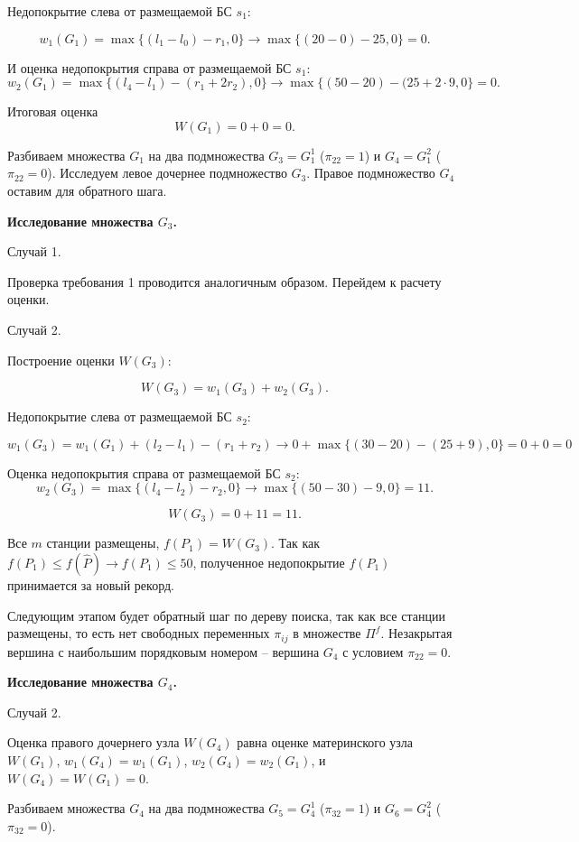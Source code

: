 Недопокрытие слева от размещаемой БС $s_1$:

$$
w_1(G_1) = \max\{(l_1 - l_0) - r_1, 0\} \rightarrow \max\{(20 - 0) - 25, 0\} = 0.
$$

И оценка недопокрытия справа от размещаемой БС $s_1$: 
$$
w_2(G_1) = \max\{(l_4 - l_1) - (r_1 + 2r_2), 0\} \rightarrow \max\{(50 - 20) - (25 + 2 \cdot 9, 0\} = 0.
$$

Итоговая оценка
$$
W(G_1) = 0 + 0 = 0.
$$

Разбиваем множества $G_1$ на два подмножества $G_3 = G^1_1$ ($\pi_{22} = 1$) и $G_4 = G^2_1$ ($\pi_{22} = 0$). Исследуем  левое дочернее подмножество $G_3$. Правое подмножество $G_4$ оставим для обратного шага.

\textbf{Исследование множества $G_3$.}

Случай 1.

Проверка требования 1 проводится аналогичным образом. Перейдем к расчету оценки.

Случай 2.

Построение оценки $W(G_3)$:

$$
W(G_3) = w_1(G_3) + w_2(G_3).
$$

Недопокрытие слева от размещаемой БС $s_2$:

$$
w_1(G_3) =  w_1(G_1) + (l_2 - l_1) - (r_1 + r_2) \rightarrow 0 + \max\{(30 - 20) - (25+ 9), 0\} = 0 + 0 = 0
$$

Оценка недопокрытия справа от размещаемой БС $s_2$: 
$$
w_2(G_3) = \max\{(l_4 - l_2) - r_2, 0\} \rightarrow \max\{(50 - 30) - 9, 0\} = 11.
$$

$$
W(G_3) = 0 + 11 = 11.
$$

Все $m$ станции размещены, $f(P_1) = W(G_3)$. Так как $f(P_1) \leqslant f(\widehat{P}) \rightarrow f(P_1) \leqslant 50$, полученное недопокрытие $f(P_1)$ принимается за новый рекорд.

Следующим этапом будет обратный шаг по дереву поиска, так как все станции размещены, то есть нет свободных переменных $\pi_{ij}$ в множестве $\Pi^f$. Незакрытая вершина с наибольшим порядковым номером -- вершина $G_4$ с условием $\pi_{22}=0$.

\textbf{Исследование множества $G_4$.}


Случай 2.

Оценка правого дочернего узла $W(G_4)$ равна оценке материнского узла $W(G_1)$, $w_1(G_4)=w_1(G_1)$, $w_2(G_4) = w_2(G_1)$, и $W(G_4) = W(G_1) = 0$.


Разбиваем множества $G_4$ на два подмножества $G_5 = G^1_4$ ($\pi_{32} = 1$) и $G_6 = G^2_4$ ($\pi_{32} = 0$).

